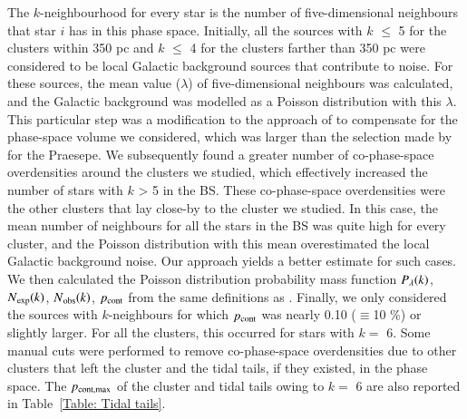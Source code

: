 \documentclass{aa}
\begin{document}
The $k$-neighbourhood for every star is the number of five-dimensional neighbours that star $i$ has in this phase space. Initially, all the sources with $k$ $\leq$ 5 for the clusters within 350 pc and $k$ $\leq$ 4 for the clusters farther than 350 pc were considered to be local Galactic background sources that contribute to noise. For these sources, the mean value ($\lambda$) of five-dimensional neighbours was calculated, and the Galactic background was modelled as a Poisson distribution with this $\lambda$. 
This particular step was a modification to the approach of  to compensate for the phase-space volume we considered, which was larger than the selection made by  for the Praesepe. We subsequently found a greater number of co-phase-space overdensities around the clusters we studied, which effectively increased the number of stars with $k$ > 5 in the BS. These co-phase-space overdensities were the other clusters that lay close-by to the cluster we studied.
In this case, the mean number of neighbours for all the stars in the BS was quite high for every cluster, and the Poisson distribution with this mean overestimated the local Galactic background noise. Our approach yields a better estimate for such cases. We then calculated the Poisson distribution probability mass function $P\textsubscript{$\lambda$}(k)$, $N\textsubscript{exp}(k)$, $N\textsubscript{obs}(k)$, $p\textsubscript{cont}$ from the same definitions as .  Finally, we only considered the sources with $k$-neighbours for which $p_{\rm{cont}}$ was nearly 0.10 ($\equiv$10 \%) or slightly larger. For all the clusters, this occurred for stars with $k =$ 6. Some manual cuts were performed to remove co-phase-space overdensities due to other clusters that left the cluster and the tidal tails, if they existed, in the phase space. The $p_{\rm{cont,max}}$ of the cluster and tidal tails owing to $k =$ 6 are also reported in Table~\ref{Table: Tidal tails}.
\end{document}
